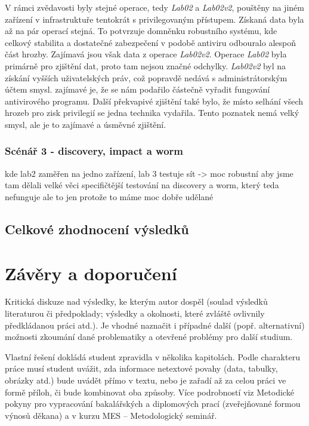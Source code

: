 V rámci zvědavosti byly stejné operace, tedy \textit{Lab02} a \textit{Lab02v2}, pouštěny na jiném zařízení v infrastruktuře tentokrát s privilegovaným přístupem.
Získaná data byla až na pár operací stejná.
To potvrzuje domněnku robustního systému, kde celkový stabilita a dostatečné zabezpečení v podobě antiviru odbouralo alespoň část hrozby.
Zajímavá jsou však data z operace \textit{Lab02v2}.
Operace \textit{Lab02} byla primárně pro zjištění dat, proto tam nejsou značné odchylky.
\textit{Lab02v2} byl na získání vyšších uživatelských práv, což popravdě nedává s administrátorským účtem smysl.
zajímavé je, že se nám podařilo částečně vyřadit fungování antivirového programu.
Další překvapivé zjištění také bylo, že místo selhání všech hrozeb pro zisk privilegií se jedna technika vydařila.
Tento poznatek nemá velký smysl, ale je to zajímavé a úsměvné zjištění.


\subsubsection{Scénář 3 - discovery, impact a worm}
kde lab2 zaměřen na jedno zařízení, lab 3 testuje sít -> moc robustní aby jsme tam dělali velké věci
specifičtější testování na discovery a worm, který teda nefunguje ale to jen protože to máme moc dobře udělané

\subsection{Celkové zhodnocení výsledků}\label{subsec:celkove-zhodnoceni-vysledku}


\section{Závěry a doporučení}\label{sec:zavery-a-doporuceni}


Kritická diskuze nad výsledky, ke kterým autor dospěl (soulad výsledků  literaturou či předpoklady;
výsledky a okolnosti, které zvláště ovlivnily předkládanou práci atd.).
Je vhodné naznačit i případné další
(popř. alternativní) možnosti zkoumání dané problematiky a otevřené problémy pro další studium.





Vlastní řešení dokládá student zpravidla v několika kapitolách.
Podle charakteru práce musí student uvážit, zda informace
netextové povahy (data, tabulky, obrázky atd.) bude uvádět přímo v textu, nebo je zařadí až za celou práci ve formě příloh, či bude kombinovat oba způsoby.
Více podrobností viz Metodické pokyny pro vypracování bakalářských a diplomových prací (zveřejňované formou výnosů děkana)
a v kurzu MES – Metodologický seminář.

